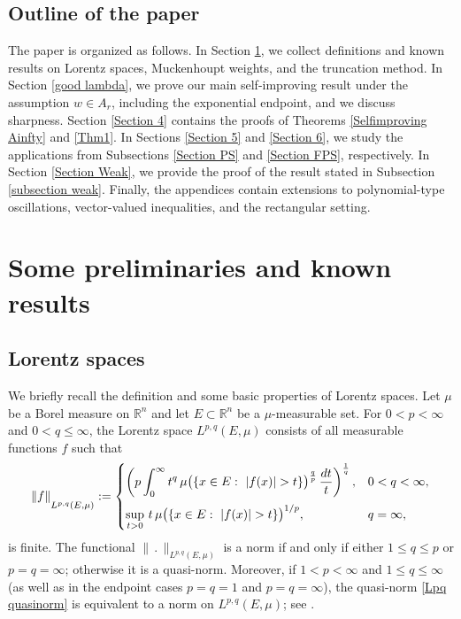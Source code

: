 \documentclass[reqno, 10pt, oneside]{amsart}
\numberwithin{equation}{section}
\newcommand{\strt}[1]{\rule{0pt}{#1}}
\numberwithin{theorem}{section}
\newcommand{\R}{{\mathbb R}}
\newcommand{\1}{{\rm 1\hspace*{-0.4ex}%
\rule{0.1ex}{1.52ex}\hspace*{0.2ex}}}
\begin{document}
\subsection*{Outline of the paper}
The paper is organized as follows. In Section \ref{Section 2}, we collect definitions and known results on Lorentz spaces, Muckenhoupt weights, and the truncation method. In Section \ref{good lambda}, we prove our main self-improving result under the assumption $w\in A_r$, including the exponential endpoint, and we discuss sharpness. Section \ref{Section 4} contains the proofs of Theorems \ref{Selfimproving Ainfty} and \ref{Thm1}. In Sections \ref{Section 5} and \ref{Section 6}, we study the applications from Subsections \ref{Section PS} and \ref{Section FPS}, respectively. In Section \ref{Section Weak}, we provide the proof of the result stated in Subsection \ref{subsection weak}. Finally, the appendices contain extensions to polynomial-type oscillations, vector-valued inequalities, and the rectangular setting.






\section{Some preliminaries and known results}\label{Section 2}

\subsection{Lorentz spaces}

We briefly recall the definition and some basic properties of Lorentz spaces. Let $\mu$ be a Borel measure on $\R^n$ and let $E\subset\R^n$ be a $\mu$-measurable set. For $0<p<\infty$ and $0<q\le\infty$, the Lorentz space $L^{p,q}(E,\mu)$ consists of all measurable functions $f$ such that
\begin{equation}\label{Lpq quasinorm}
	\|f\|_{\strt{2.3ex} L^{p,q}(E,\mu)}
	:=\begin{cases}
		\left(p\displaystyle\int_0^\infty
		t^{q}\,\mu\big(\{x\in E:\ |f(x)|>t\}\big)^{\frac{q}{p}}\,\frac{dt}{t}\right)^{\frac{1}{q}},
		& 0<q<\infty,\\[1.1em]
		\displaystyle\sup_{t>0}\, t\,\mu\big(\{x\in E:\ |f(x)|>t\}\big)^{1/p}, & q=\infty,
	\end{cases}
\end{equation}
is finite. The functional $\|\,.\,\|_{L^{p,q}(E,\mu)}$ is a norm if and only if either $1\le q\le p$ or $p=q=\infty$; otherwise it is a quasi-norm. Moreover, if $1<p<\infty$ and $1\le q\le\infty$ (as well as in the endpoint cases $p=q=1$ and $p=q=\infty$), the quasi-norm \eqref{Lpq quasinorm} is equivalent to a norm on $L^{p,q}(E,\mu)$; see \cite{BS}.
\end{document}
